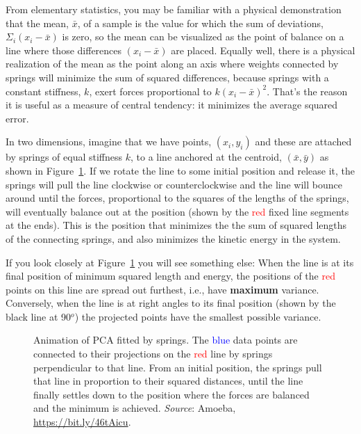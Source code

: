 \documentclass[
  letterpaper,
  10pt,
  krantz2]{krantz}
\begin{document}
From elementary statistics, you may be familiar with a physical
demonstration that the mean, \(\bar{x}\), of a sample is the value for
which the sum of deviations, \(\Sigma_i (x_i - \bar{x})\) is zero, so
the mean can be visualized as the point of balance on a line where those
differences \((x_i - \bar{x})\) are placed. Equally well, there is a
physical realization of the mean as the point along an axis where
weights connected by springs will minimize the sum of squared
differences, because springs with a constant stiffness, \(k\), exert
forces proportional to \(k (x_i - \bar{x}) ^2\). That's the reason it is
useful as a measure of central tendency: it minimizes the average
squared error.

In two dimensions, imagine that we have points, \((x_i, y_i)\) and these
are attached by springs of equal stiffness \(k\), to a line anchored at
the centroid, \((\bar{x}, \bar{y})\) as shown in
Figure~\ref{fig-pca-springs}. If we rotate the line to some initial
position and release it, the springs will pull the line clockwise or
counterclockwise and the line will bounce around until the forces,
proportional to the squares of the lengths of the springs, will
eventually balance out at the position (shown by the
\textcolor{red}{red} fixed line segments at the ends). This is the
position that minimizes the the sum of squared lengths of the connecting
springs, and also minimizes the kinetic energy in the system.

If you look closely at Figure~\ref{fig-pca-springs} you will see
something else: When the line is at its final position of minimum
squared length and energy, the positions of the \textcolor{red}{red}
points on this line are spread out furthest, i.e., have \textbf{maximum}
variance. Conversely, when the line is at right angles to its final
position (shown by the black line at 90\(^o\)) the projected points have
the smallest possible variance.

\begin{figure}

\centering{

}

\caption{\label{fig-pca-springs}Animation of PCA fitted by springs. The
\textcolor{blue}{blue} data points are connected to their projections on
the \textcolor{red}{red} line by springs perpendicular to that line.
From an initial position, the springs pull that line in proportion to
their squared distances, until the line finally settles down to the
position where the forces are balanced and the minimum is achieved.
\emph{Source}: Amoeba, \url{https://bit.ly/46tAicu}.}

\end{figure}%
\end{document}
